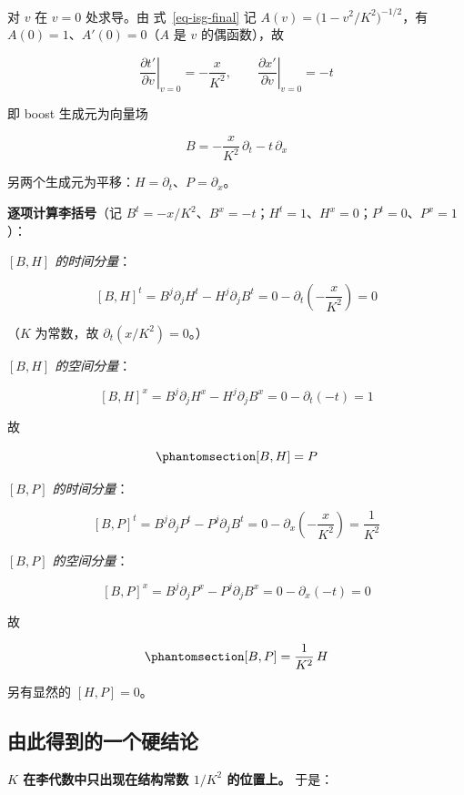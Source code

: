 \documentclass[
  chinese,
  a4paper,
  UTF8,
  12pt,
  oneside,
  openany]{ctexbook}
\theoremstyle{plain}
\theoremstyle{plain}
\theoremstyle{plain}
\theoremstyle{definition}
\theoremstyle{plain}
\theoremstyle{plain}
\theoremstyle{remark}
\begin{document}
对 \(v\) 在 \(v=0\) 处求导。由 式~\ref{eq-isg-final} 记
\(A(v)=\bigl(1-v^{2}/K^{2}\bigr)^{-1/2}\)，有
\(A(0)=1\)、\(A'(0)=0\)（\(A\) 是 \(v\) 的偶函数），故

\[
\left.\frac{\partial t'}{\partial v}\right|_{v=0}=-\frac{x}{K^{2}},\qquad
\left.\frac{\partial x'}{\partial v}\right|_{v=0}=-t
\]

即 boost 生成元为向量场

\[
B=-\frac{x}{K^{2}}\,\partial_t-t\,\partial_x
\]

另两个生成元为平移：\(H=\partial_t\)、\(P=\partial_x\)。

\textbf{逐项计算李括号}（记
\(B^{t}=-x/K^{2}\)、\(B^{x}=-t\)；\(H^{t}=1\)、\(H^{x}=0\)；\(P^{t}=0\)、\(P^{x}=1\)）：

\emph{\([B,H]\) 的时间分量}：

\[
[B,H]^{t}=B^{j}\partial_j H^{t}-H^{j}\partial_j B^{t}
=0-\partial_t\!\left(-\frac{x}{K^{2}}\right)=0
\]

（\(K\) 为常数，故 \(\partial_t(x/K^{2})=0\)。）

\emph{\([B,H]\) 的空间分量}：

\[
[B,H]^{x}=B^{j}\partial_j H^{x}-H^{j}\partial_j B^{x}
=0-\partial_t(-t)=1
\]

故

\begin{equation}\protect\phantomsection\label{eq-ifg-BH}{
[B,H]=P
}\end{equation}

\emph{\([B,P]\) 的时间分量}：

\[
[B,P]^{t}=B^{j}\partial_j P^{t}-P^{j}\partial_j B^{t}
=0-\partial_x\!\left(-\frac{x}{K^{2}}\right)=\frac{1}{K^{2}}
\]

\emph{\([B,P]\) 的空间分量}：

\[
[B,P]^{x}=B^{j}\partial_j P^{x}-P^{j}\partial_j B^{x}
=0-\partial_x(-t)=0
\]

故

\begin{equation}\protect\phantomsection\label{eq-ifg-BP}{
[B,P]=\frac{1}{K^{2}}\,H
}\end{equation}

另有显然的 \([H,P]=0\)。

\subsection{由此得到的一个硬结论}\label{ux7531ux6b64ux5f97ux5230ux7684ux4e00ux4e2aux786cux7ed3ux8bba}

\textbf{\(K\) 在李代数中只出现在结构常数 \(1/K^{2}\) 的位置上。} 于是：
\end{document}
